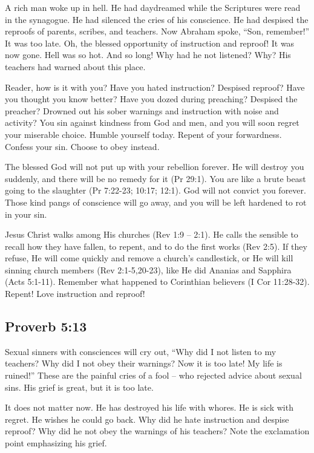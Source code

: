 A rich man woke up in hell. He had daydreamed while the Scriptures were read in the synagogue. He had silenced the cries of his conscience. He had despised the reproofs of parents, scribes, and teachers. Now Abraham spoke, “Son, remember!” It was too late. Oh, the blessed opportunity of instruction and reproof! It was now gone. Hell was so hot. And so long! Why had he not listened? Why? His teachers had warned about this place.

Reader, how is it with you? Have you hated instruction? Despised reproof? Have you thought you know better? Have you dozed during preaching? Despised the preacher? Drowned out his sober warnings and instruction with noise and activity? You sin against kindness from God and men, and you will soon regret your miserable choice. Humble yourself today. Repent of your forwardness. Confess your sin. Choose to obey instead.

The blessed God will not put up with your rebellion forever. He will destroy you suddenly, and there will be no remedy for it (Pr 29:1). You are like a brute beast going to the slaughter (Pr 7:22-23; 10:17; 12:1). God will not convict you forever. Those kind pangs of conscience will go away, and you will be left hardened to rot in your sin.

Jesus Christ walks among His churches (Rev 1:9 – 2:1). He calls the sensible to recall how they have fallen, to repent, and to do the first works (Rev 2:5). If they refuse, He will come quickly and remove a church’s candlestick, or He will kill sinning church members (Rev 2:1-5,20-23), like He did Ananias and Sapphira (Acts 5:1-11). Remember what happened to Corinthian believers (I Cor 11:28-32). Repent! Love instruction and reproof!

\subsection{Proverb 5:13}
Sexual sinners with consciences will cry out, “Why did I not listen to my teachers? Why did I not obey their warnings? Now it is too late! My life is ruined!” These are the painful cries of a fool – who rejected advice about sexual sins. His grief is great, but it is too late.

It does not matter now. He has destroyed his life with whores. He is sick with regret. He wishes he could go back. Why did he hate instruction and despise reproof? Why did he not obey the warnings of his teachers? Note the exclamation point emphasizing his grief.

